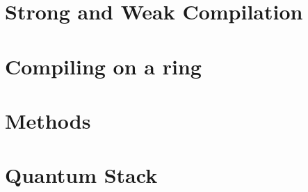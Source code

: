 \section{Strong and Weak Compilation}

\section{Compiling on a ring}

\section{Methods}

\section{Quantum Stack}
